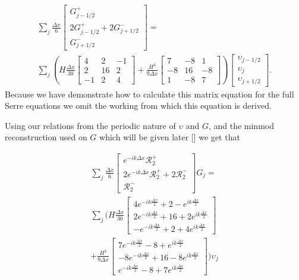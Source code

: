 \begin{multline*}
\sum_j \frac{\Delta x}{6}\begin{bmatrix} G^+_{j -1/2} \\2 G^+_{j -1/2}+2 G^-_{j +1/2} \\ G^-_{j +1/2} \end{bmatrix} = \\\sum_j \left(H\frac{\Delta x}{30}\begin{bmatrix} 4 &2 &-1 \\2 &16 &2  \\-1 &2 &4 \end{bmatrix} + \frac{H^3 }{9\Delta x}\begin{bmatrix} 7 &-8 &1  \\-8 &16 &-8  \\1 &-8 &7  \end{bmatrix} \right) \begin{bmatrix} \upsilon_{j -1/2} \\\upsilon_{j} \\ \upsilon_{j +1/2} \end{bmatrix}.
\end{multline*}
Because we have demonstrate how to calculate this matrix equation for the full Serre equations we omit the working from which this equation is derived.

 Using our relations from the periodic nature of $\upsilon$ and $G$, and the minmod reconstruction used on $G$ which will be given later [] we get that
 
 \begin{multline*}
 \sum_j \frac{\Delta x}{6}\begin{bmatrix} e^{-ik\Delta x} \mathcal{R}^+_2 \\2 e^{-ik\Delta x} \mathcal{R}^+_2 +2 \mathcal{R}^-_2 \\ \mathcal{R}^-_2 \end{bmatrix} G_j = \\\sum_j \Bigg(H\frac{\Delta x}{30}\begin{bmatrix} 4e^{-ik\frac{\Delta x}{2}} +  2 - e^{ik\frac{\Delta x}{2}}\\2e^{-ik\frac{\Delta x}{2}}  + 16  +2 e^{ik\frac{\Delta x}{2}}  \\ -e^{-ik\frac{\Delta x}{2}} +  2 + 4e^{ik\frac{\Delta x}{2}} \end{bmatrix} \\+ \frac{H^3 }{9\Delta x}\begin{bmatrix} 7e^{-ik\frac{\Delta x}{2}} -8 + e^{ik\frac{\Delta x}{2}} \\ -8e^{-ik\frac{\Delta x}{2}} +  16  -8e^{ik\frac{\Delta x}{2}} \\ e^{-ik\frac{\Delta x}{2}} -8 + 7e^{ik\frac{\Delta x}{2}} \end{bmatrix}  \Bigg) \upsilon_j
 \end{multline*}
 
